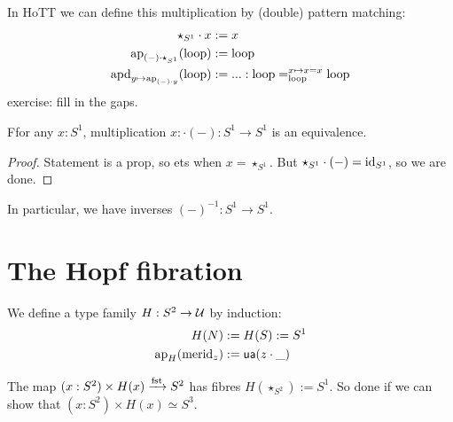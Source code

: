 \documentclass[10pt,oneside,leqno,openright]{memoir}
\begin{document}
In HoTT we can define this multiplication by (double) pattern matching:
\begin{align*}
  \star_{S^1} \cdot x &:= x\\
  \operatorname{ap}_{(-)\cdot \star_{S^1}}(\mathrm{loop}) &:= \mathrm{loop}\\
  \operatorname{apd}_{y \mapsto\operatorname{ap}_{(-)\cdot y}}(\mathrm{loop}) &:= ... : \mathrm{loop} =^{x \mapsto x = x}_{\mathrm{loop}} \mathrm{loop}
\end{align*}
exercise: fill in the gaps.
\begin{proposition}
  Ffor any $x : S^1$, multiplication $x : \cdot (-) : S^1 \to S^1$ is an equivalence.
\end{proposition}
\begin{proof}
  Statement is a prop, so ets when $x=\star_{S^1}$. But $\star_{S^1} \cdot (-) = \operatorname{id}_{S^1}$, so we are done.
\end{proof}

In particular, we have inverses $(-)^{-1} : S^1 \to S^1$.

\section*{The Hopf fibration}

\begin{definition}
  We define a type family $H : S^2 \to \mathcal{U}$ by induction:
  \begin{align*}
    H(N) &:= H(S) := S^1 \\
    \operatorname{ap}_H(\operatorname{merid}_z) &:= \mathsf{ua}(z \cdot \_)
  \end{align*}
\end{definition}
The map $(x : S^2) \times H(x) \xrightarrow{\operatorname{fst}} S^2$ has fibres $H(\star_{S^2}) := S^1$. So done if we can show that $(x : S^2) \times H(x) \simeq S^3$.
\end{document}
